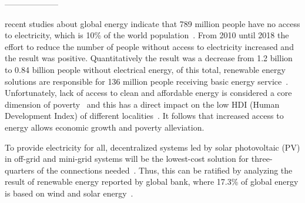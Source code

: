 \documentclass[10pt,journal,compsoc]{IEEEtran}
\begin{document}
%
\IEEEpeerreviewmaketitle



% 
% 
% 
% 
--------------------
 
 recent studies about global energy indicate that 789 million people have no access to electricity, which is 10\% of the world population~\cite{Energyprogressreport}. From 2010 until 2018 the effort to reduce the number of people without access to electricity increased and the result was positive. Quantitatively the result was a decrease from 1.2 billion to 0.84 billion people without electrical energy, of this total, renewable energy solutions are responsible for 136 million people receiving basic energy service~\cite{Energyprogressreport}. Unfortunately, lack of access to clean and affordable energy is considered a core dimension of poverty~\cite{Hussein2012} and this has a direct impact on the low HDI (Human Development Index) of different localities~\cite{Coelho}. It follows that increased access to energy allows economic growth and poverty alleviation\cite{Karekesi}. 

To provide electricity for all, decentralized systems led by solar photovoltaic (PV) in off-grid and mini-grid systems will be the lowest-cost solution for three-quarters of the connections needed~\cite{Hussein2012}. Thus, this can be ratified by analyzing the result of renewable energy reported by global bank, where 17.3\%  of global energy is based on wind and solar energy~\cite{Energyprogressreport}.
\end{document}
